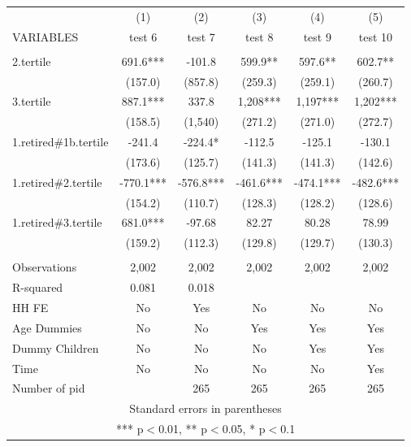 \begin{tabular}{lccccc} \hline
 & (1) & (2) & (3) & (4) & (5) \\
VARIABLES & test 6 & test 7 & test 8 & test 9 & test 10 \\ \hline
 &  &  &  &  &  \\
2.tertile & 691.6*** & -101.8 & 599.9** & 597.6** & 602.7** \\
 & (157.0) & (857.8) & (259.3) & (259.1) & (260.7) \\
3.tertile & 887.1*** & 337.8 & 1,208*** & 1,197*** & 1,202*** \\
 & (158.5) & (1,540) & (271.2) & (271.0) & (272.7) \\
1.retired\#1b.tertile & -241.4 & -224.4* & -112.5 & -125.1 & -130.1 \\
 & (173.6) & (125.7) & (141.3) & (141.3) & (142.6) \\
1.retired\#2.tertile & -770.1*** & -576.8*** & -461.6*** & -474.1*** & -482.6*** \\
 & (154.2) & (110.7) & (128.3) & (128.2) & (128.6) \\
1.retired\#3.tertile & 681.0*** & -97.68 & 82.27 & 80.28 & 78.99 \\
 & (159.2) & (112.3) & (129.8) & (129.7) & (130.3) \\
 &  &  &  &  &  \\
Observations & 2,002 & 2,002 & 2,002 & 2,002 & 2,002 \\
R-squared & 0.081 & 0.018 &  &  &  \\
HH FE & No & Yes & No & No & No \\
Age Dummies & No & No & Yes & Yes & Yes \\
Dummy Children & No & No & No & Yes & Yes \\
Time & No & No & No & No & Yes \\
 Number of pid &  & 265 & 265 & 265 & 265 \\ \hline
\multicolumn{6}{c}{ Standard errors in parentheses} \\
\multicolumn{6}{c}{ *** p$<$0.01, ** p$<$0.05, * p$<$0.1} \\
\end{tabular}
